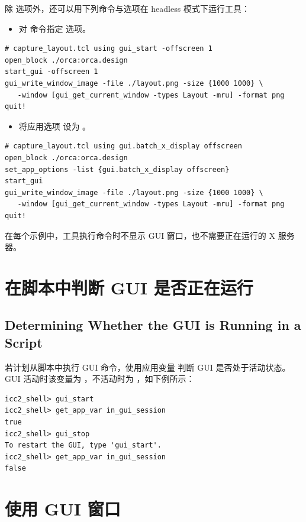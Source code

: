 除  选项外，还可以用下列命令与选项在 headless 模式下运行工具：
\begin{itemize}
  \item 对  命令指定  选项。
\end{itemize}
\begin{lstlisting}
# capture_layout.tcl using gui_start -offscreen 1
open_block ./orca:orca.design
start_gui -offscreen 1
gui_write_window_image -file ./layout.png -size {1000 1000} \
   -window [gui_get_current_window -types Layout -mru] -format png
quit!
\end{lstlisting}
\begin{itemize}
  \item 将应用选项  设为 。
\end{itemize}
\begin{lstlisting}
# capture_layout.tcl using gui.batch_x_display offscreen
open_block ./orca:orca.design
set_app_options -list {gui.batch_x_display offscreen}
start_gui
gui_write_window_image -file ./layout.png -size {1000 1000} \
   -window [gui_get_current_window -types Layout -mru] -format png
quit!
\end{lstlisting}

在每个示例中，工具执行命令时不显示 GUI 窗口，也不需要正在运行的 X 服务器。

\section{在脚本中判断 GUI 是否正在运行}
\subsection*{Determining Whether the GUI is Running in a Script}

若计划从脚本中执行 GUI 命令，使用应用变量 \cmd{in\_gui\_session} 判断 GUI 是否处于活动状态。GUI 活动时该变量为 ，不活动时为 ，如下例所示：
\begin{lstlisting}
icc2_shell> gui_start
icc2_shell> get_app_var in_gui_session
true
icc2_shell> gui_stop
To restart the GUI, type 'gui_start'.
icc2_shell> get_app_var in_gui_session
false
\end{lstlisting}

\section{使用 GUI 窗口}
